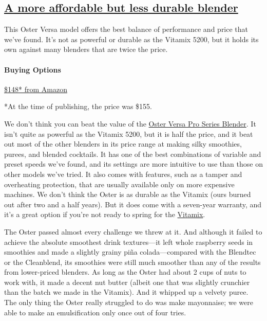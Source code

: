 \hypertarget{a-more-affordable-but-less-durable-blender-2}{%
\subsection{\texorpdfstring{\href{https://www.nytimes3xbfgragh.onion/wirecutter/out/link/3754/162049/4/109195?merchant=Amazon}{A
more affordable but less durable
blender}}{A more affordable but less durable blender}}\label{a-more-affordable-but-less-durable-blender-2}}

This Oster Versa model offers the best balance of performance and price
that we've found. It's not as powerful or durable as the Vitamix 5200,
but it holds its own against many blenders that are twice the price.

\hypertarget{buying-options-9}{%
\paragraph{Buying Options}\label{buying-options-9}}

\href{https://www.nytimes3xbfgragh.onion/wirecutter/out/link/3754/162049/4/109195?merchant=Amazon}{\$148*
from Amazon}

*At the time of publishing, the price was \$155.

We don't think you can beat the value of the
\href{https://www.nytimes3xbfgragh.onion/wirecutter/out/link/3754/162049/4/69780/?merchant=Amazon}{Oster
Versa Pro Series Blender}. It isn't quite as powerful as the Vitamix
5200, but it is half the price, and it beat out most of the other
blenders in its price range at making silky smoothies, purees, and
blended cocktails. It has one of the best combinations of variable and
preset speeds we've found, and its settings are more intuitive to use
than those on other models we've tried. It also comes with features,
such as a tamper and overheating protection, that are usually available
only on more expensive machines. We don't think the Oster is as durable
as the Vitamix (ours burned out after two and a half years). But it does
come with a seven-year warranty, and it's a great option if you're not
ready to spring for the
\protect\hyperlink{our-pick-vitamix-5200}{Vitamix}.

The Oster passed almost every challenge we threw at it. And although it
failed to achieve the absolute smoothest drink textures---it left whole
raspberry seeds in smoothies and made a slightly grainy piña
colada---compared with the Blendtec or the Cleanblend, its smoothies
were still much smoother than any of the results from lower-priced
blenders. As long as the Oster had about 2 cups of nuts to work with, it
made a decent nut butter (albeit one that was slightly crunchier than
the batch we made in the Vitamix). And it whipped up a velvety puree.
The only thing the Oster really struggled to do was make mayonnaise; we
were able to make an emulsification only once out of four tries.

